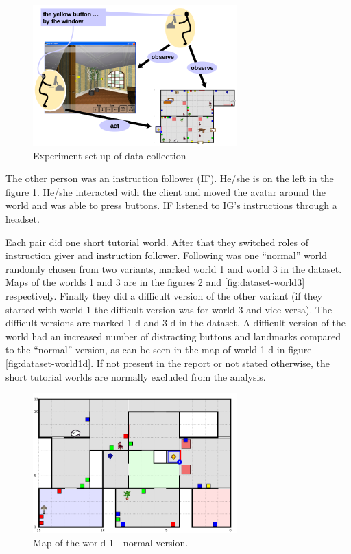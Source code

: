 \begin{figure}[!htbp]
  \centering
	\includegraphics[width=0.7\textwidth]{Images/experiment-set-up}
	\caption{Experiment set-up of data collection}
	\label{fig:give-experiment-setup}
\end{figure}

The other person was an instruction follower (IF). He/she is on the left in the figure \ref{fig:give-experiment-setup}. He/she interacted with the client and moved the avatar around the world and was able to press buttons. IF listened to IG's instructions through a headset.

Each pair did one short tutorial world. After that they switched roles of instruction giver and instruction follower. Following was one ``normal'' world randomly chosen from two variants, marked world 1 and world 3 in the dataset. Maps of the worlds 1 and 3 are in the figures \ref{fig:dataset-world1} and \ref{fig:dataset-world3} respectively. Finally they did a difficult version of the other variant (if they started with world 1 the difficult version was for world 3 and vice versa). The difficult versions are marked 1-d and 3-d in the dataset. A difficult version of the world had an increased number of distracting buttons and landmarks compared to the ``normal'' version, as can be seen in the map of world 1-d in figure \ref{fig:dataset-world1d}. If not present in the report or not stated otherwise, the short tutorial worlds are normally excluded from the analysis.

\begin{figure}[!htbp]
  \centering
	\includegraphics[width=0.7\textwidth]{Images/dataset-world1}
	\caption{Map of the world 1 - normal version.}
	\label{fig:dataset-world1}
\end{figure}


